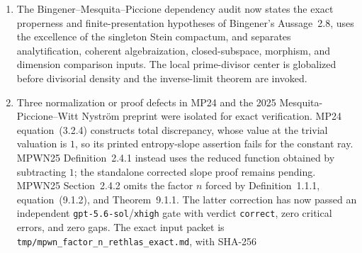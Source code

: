 \begin{enumerate}
  polynomialization of analytic primary ideals, the two-chart Rees
  calculation separating special-fibre multiplicity \(b_E\) from tautological
  fibre degree one, the Chow-group vanishing of components over
  higher-codimension strata, and the ramification--residue-degree proof of
  the finite-map factor (unconditional for ideals and conditional on
  pullback preserving the stated locus otherwise).  The rational model statement is restricted to an
  algebraizable common log model, and the comparison extends only to the
  explicitly defined joint bounded closure built from those model
  approximants.  A two-atom surface
  calculation rules out
  probability renormalization compatible with literal restriction, and the
  sequence \((y,x^k)\) separates full monotone from nonpluripolar continuation
  at a polar endpoint.  Arbitrary curve-test psh, nonalgebraizable analytic
  models, finite-energy, unbounded, singular, and nonnormal extensions remain
  open.  Rethlas verified the exact
  blueprint with statement digest
  \texttt{923e70de7a01fd5db358b35d509323b33a9bd9d586003bb0498fd8663bc7820a}
  and proof digest
  \texttt{64776c912e47b1c0ac68fa2e26e316f855a72ed6b94dc720f8d25e9d1957112c}
  using \texttt{gpt-5.6-sol} at \texttt{xhigh} scrutiny.
\item The Bingener--Mesquita--Piccione dependency audit now states the exact
  properness and finite-presentation hypotheses of Bingener's Aussage~2.8,
  uses the excellence of the singleton Stein compactum, and separates
  analytification, coherent algebraization, closed-subspace, morphism, and
  dimension comparison inputs.  The local prime-divisor center is globalized
  before divisorial density and the inverse-limit theorem are invoked.
\item Three normalization or proof defects in MP24 and the 2025
  Mesquita-Piccione--Witt Nystr\"om preprint were isolated for exact
  verification.  MP24 equation~(3.2.4) constructs total discrepancy, whose
  value at the trivial valuation is \(1\), so its printed entropy-slope
  assertion fails for the constant ray.  MPWN25 Definition~2.4.1 instead
  uses the reduced function obtained by subtracting \(1\); the standalone
  corrected slope proof remains pending.  MPWN25 Section~2.4.2 omits the factor
  \(n\) forced by Definition~1.1.1, equation~(9.1.2), and Theorem~9.1.1.
  The latter correction has now passed an independent
  \texttt{gpt-5.6-sol}/\texttt{xhigh} gate with verdict \texttt{correct},
  zero critical errors, and zero gaps.  The exact input packet is
  \nolinkurl{tmp/mpwn_factor_n_rethlas_exact.md}, with SHA-256

\end{enumerate}
